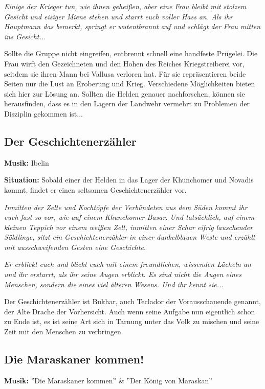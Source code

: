 \emph{Einige der Krieger tun, wie ihnen geheißen, aber eine Frau bleibt mit stolzem Gesicht und eisiger Miene stehen und starrt euch voller Hass an. Als ihr Hauptmann das bemerkt, springt er wutentbrannt auf und schlägt der Frau mitten ins Gesicht...} 

Sollte die Gruppe nicht eingreifen, entbrennt schnell eine handfeste Prügelei. Die Frau wirft den Gezeichneten und den Hohen des Reiches Kriegstreiberei vor, seitdem sie ihren Mann bei Vallusa verloren hat. Für sie repräsentieren beide Seiten nur die Lust an Eroberung und Krieg. Verschiedene Möglichkeiten bieten sich hier zur Lösung an. Sollten die Helden genauer nachforschen, können sie herausfinden, dass es in den Lagern der Landwehr vermehrt zu Problemen der Disziplin gekommen ist...

\subsection{Der Geschichtenerzähler}

\textbf{Musik:} Ibelin

\textbf{Situation:} Sobald einer der Helden in das Lager der Khunchomer und Novadis kommt, findet er einen seltsamen Geschichtenerzähler vor. 

\emph{Inmitten der Zelte und Kochtöpfe der Verbündeten aus dem Süden kommt ihr euch fast so vor, wie auf einem Khunchomer Basar. Und tatsächlich, auf einem kleinen Teppich vor einem weißen Zelt, inmitten einer Schar eifrig lauschender Söldlinge, sitzt ein Geschichtenerzähler in einer dunkelblauen Weste und erzählt mit ausschweifenden Gesten eine Geschichte.} 

\emph{Er erblickt euch und blickt euch mit einem freundlichen, wissenden Lächeln an und ihr erstarrt, als ihr seine Augen erblickt. Es sind nicht die Augen eines Menschen, sondern die eines viel älteren Wesens. Und ihr kennt sie...} 

Der Geschichtenerzähler ist Bukhar, auch Teclador der Vorausschauende genannt, der Alte Drache der Vorhersicht. Auch wenn seine Aufgabe nun eigentlich schon zu Ende ist, es ist seine Art sich in Tarnung unter das Volk zu mischen und seine Zeit mit den Menschen zu verbringen.

\subsection{Die Maraskaner kommen!}

\textbf{Musik:} ''Die Maraskaner kommen'' \& ''Der König von Maraskan''

